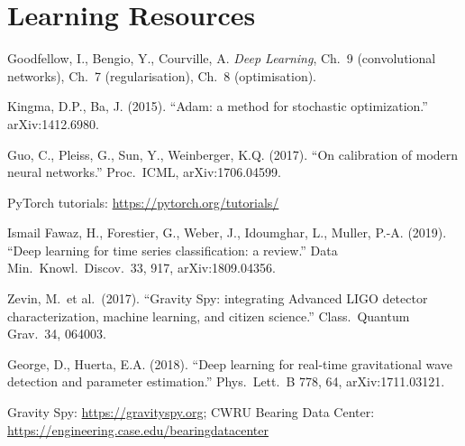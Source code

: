 \documentclass[11pt,a4paper]{article}
\begin{document}
\section*{Learning Resources}
\begin{resources}
  \item Goodfellow, I., Bengio, Y., Courville, A. \emph{Deep Learning}, Ch.~9 (convolutional networks), Ch.~7 (regularisation), Ch.~8 (optimisation).
  \item Kingma, D.P., Ba, J. (2015). ``Adam: a method for stochastic optimization.'' arXiv:1412.6980.
  \item Guo, C., Pleiss, G., Sun, Y., Weinberger, K.Q. (2017). ``On calibration of modern neural networks.'' Proc.\ ICML, arXiv:1706.04599.
  \item PyTorch tutorials: \url{https://pytorch.org/tutorials/}
\end{resources}
\begin{resources}
  \item Ismail Fawaz, H., Forestier, G., Weber, J., Idoumghar, L., Muller, P.-A. (2019). ``Deep learning for time series classification: a review.'' Data Min.\ Knowl.\ Discov.\ 33, 917, arXiv:1809.04356.
  \item Zevin, M.\ et al.\ (2017). ``Gravity Spy: integrating Advanced LIGO detector characterization, machine learning, and citizen science.'' Class.\ Quantum Grav.\ 34, 064003.
  \item George, D., Huerta, E.A. (2018). ``Deep learning for real-time gravitational wave detection and parameter estimation.'' Phys.\ Lett.\ B 778, 64, arXiv:1711.03121.
\end{resources}
\begin{resources}
  \item Gravity Spy: \url{https://gravityspy.org}; CWRU Bearing Data Center: \url{https://engineering.case.edu/bearingdatacenter}
\end{resources}

\evaluation
\end{document}
